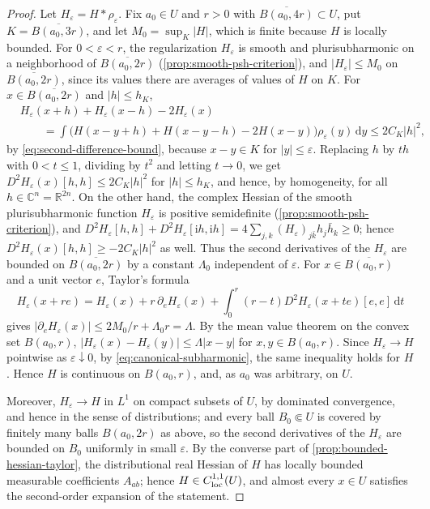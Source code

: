 \begin{proof}
Let $H_\varepsilon=H*\rho_\varepsilon$. Fix $a_0\in U$ and $r>0$ with $\overline{B(a_0,4r)}\subset U$, put $K=\overline{B(a_0,3r)}$, and let $M_0=\sup_K|H|$, which is finite because $H$ is locally bounded. For $0<\varepsilon<r$, the regularization $H_\varepsilon$ is smooth and plurisubharmonic on a neighborhood of $\overline{B(a_0,2r)}$ (\cref{prop:smooth-psh-criterion}), and $|H_\varepsilon|\le M_0$ on $\overline{B(a_0,2r)}$, since its values there are averages of values of $H$ on $K$. For $x\in\overline{B(a_0,2r)}$ and $|h|\le h_K$,
\[
 \begin{aligned}
 &H_\varepsilon(x+h)+H_\varepsilon(x-h)-2H_\varepsilon(x)\\
 &\qquad=\int\bigl(H(x-y+h)+H(x-y-h)-2H(x-y)\bigr)\rho_\varepsilon(y)\,\mathrm dy\le2C_K|h|^2,
 \end{aligned}
\]
by \eqref{eq:second-difference-bound}, because $x-y\in K$ for $|y|\le\varepsilon$. Replacing $h$ by $th$ with $0<t\le1$, dividing by $t^2$ and letting $t\to0$, we get $D^2H_\varepsilon(x)[h,h]\le2C_K|h|^2$ for $|h|\le h_K$, and hence, by homogeneity, for all $h\in\mathbb C^n=\mathbb R^{2n}$. On the other hand, the complex Hessian of the smooth plurisubharmonic function $H_\varepsilon$ is positive semidefinite (\cref{prop:smooth-psh-criterion}), and $D^2H_\varepsilon[h,h]+D^2H_\varepsilon[\mathrm ih,\mathrm ih]=4\sum_{j,k}(H_\varepsilon)_{j\bar k}h_j\bar h_k\ge0$; hence $D^2H_\varepsilon(x)[h,h]\ge-2C_K|h|^2$ as well. Thus the second derivatives of the $H_\varepsilon$ are bounded on $\overline{B(a_0,2r)}$ by a constant $\Lambda_0$ independent of $\varepsilon$. For $x\in\overline{B(a_0,r)}$ and a unit vector $e$, Taylor's formula
\[
 H_\varepsilon(x+re)=H_\varepsilon(x)+r\,\partial_eH_\varepsilon(x)+\int_0^r(r-t)D^2H_\varepsilon(x+te)[e,e]\,\mathrm dt
\]
gives $|\partial_eH_\varepsilon(x)|\le2M_0/r+\Lambda_0r=\Lambda$. By the mean value theorem on the convex set $B(a_0,r)$, $|H_\varepsilon(x)-H_\varepsilon(y)|\le\Lambda|x-y|$ for $x,y\in B(a_0,r)$. Since $H_\varepsilon\to H$ pointwise as $\varepsilon\downarrow0$, by \eqref{eq:canonical-subharmonic}, the same inequality holds for $H$. Hence $H$ is continuous on $B(a_0,r)$, and, as $a_0$ was arbitrary, on $U$.

Moreover, $H_\varepsilon\to H$ in $L^1$ on compact subsets of $U$, by dominated convergence, and hence in the sense of distributions; and every ball $B_0\Subset U$ is covered by finitely many balls $B(a_0,2r)$ as above, so the second derivatives of the $H_\varepsilon$ are bounded on $B_0$ uniformly in small $\varepsilon$. By the converse part of \cref{prop:bounded-hessian-taylor}, the distributional real Hessian of $H$ has locally bounded measurable coefficients $A_{ab}$; hence $H\in C^{1,1}_{\mathrm{loc}}(U)$, and almost every $x\in U$ satisfies the second-order expansion of the statement.


\end{proof}
